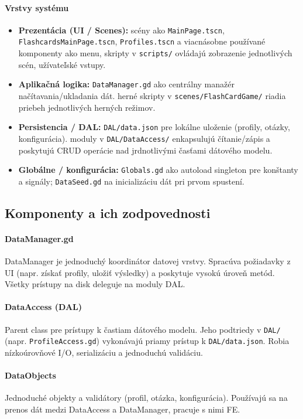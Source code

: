 \documentclass[a4paper,12pt]{article}
\begin{document}
    	\paragraph{Vrstvy systému}
    	\begin{itemize}
    		\item \textbf{Prezentácia (UI / Scenes):} scény ako \texttt{MainPage.tscn}, \texttt{FlashcardsMainPage.tscn}, \texttt{Profiles.tscn} a viacnásobne používané komponenty ako menu, skripty v \texttt{scripts/} ovládajú zobrazenie jednotlivých scén, užívateľské vstupy.
    		\item \textbf{Aplikačná logika:} \texttt{DataManager.gd} ako centrálny manažér načítavania/ukladania dát. herné skripty v \texttt{scenes/FlashCardGame/} riadia priebeh jednotlivých herných režimov.
    		\item \textbf{Persistencia / DAL:} \texttt{DAL/data.json} pre lokálne uloženie (profily, otázky, konfigurácia). moduly v \texttt{DAL/DataAccess/} enkapsulujú čítanie/zápis a poskytujú CRUD operácie nad jrdnotlivými časťami dátového modelu.
    		\item \textbf{Globálne / konfigurácia:} \texttt{Globals.gd} ako autoload singleton pre konštanty a signály; \texttt{DataSeed.gd} na inicializáciu dát pri prvom spustení.
    	\end{itemize}
    	
    	\subsection{Komponenty a ich zodpovednosti}
    	
    	\paragraph{DataManager.gd}
    	DataManager je jednoduchý koordinátor datovej vrstvy. Spracúva požiadavky z UI (napr. získať profily, uložiť výsledky) a poskytuje vysokú úroveň metód. Všetky prístupy na disk deleguje na moduly DAL.
    	
    	\paragraph{DataAccess (DAL)}
    	Parent class pre prístupy k častiam dátového modelu. Jeho podtriedy v \texttt{DAL/} (napr. \texttt{ProfileAccess.gd}) vykonávajú priamy prístup k \texttt{DAL/data.json}. Robia nízkoúrovňové I/O, serializáciu a jednoduchú validáciu.
    	
    	\paragraph{DataObjects}
    	Jednoduché objekty a validátory (profil, otázka, konfigurácia). Používajú sa na prenos dát medzi DataAccess a DataManager, pracuje s nimi FE.
    	
\end{document}
